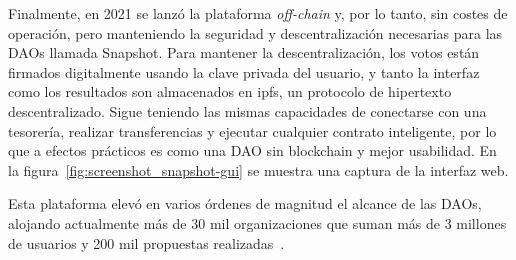 Finalmente, en 2021 se lanzó la plataforma \textit{off-chain} y, por lo tanto, sin costes de operación, pero manteniendo la seguridad y descentralización necesarias para las DAOs llamada Snapshot. Para mantener la descentralización, los votos están firmados digitalmente usando la clave privada del usuario, y tanto la interfaz como los resultados son almacenados en \gls{ipfs}, un protocolo de hipertexto descentralizado. Sigue teniendo las mismas capacidades de conectarse con una tesorería, realizar transferencias y ejecutar cualquier contrato inteligente, por lo que a efectos prácticos es como una DAO sin blockchain y mejor usabilidad. En la figura~\ref{fig:screenshot_snapshot-gui} se muestra una captura de la interfaz web.

Esta plataforma elevó en varios órdenes de magnitud el alcance de las DAOs, alojando actualmente más de 30 mil organizaciones que suman más de 3 millones de usuarios y 200 mil propuestas realizadas~\cite{pena-calvin_census_2024}.
